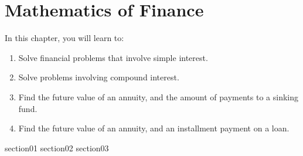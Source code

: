 \chapter{Mathematics of Finance}\label{chapter_mathematics_of_finance}

In this chapter, you will learn to:
\begin{enumerate}
    \item Solve financial problems that involve simple interest.
    \item Solve problems involving compound interest.
    \item Find the future value of an annuity, and the amount of payments to a sinking fund.
    \item Find the future value of an annuity, and an installment payment on a loan.
\end{enumerate}


{section01}
{section02}
{section03}
